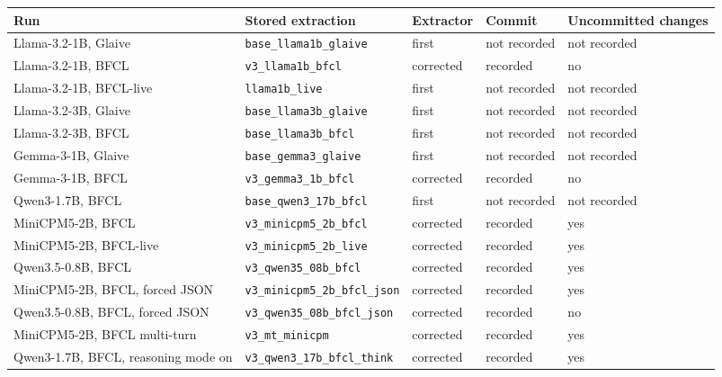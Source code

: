 \begin{tabular}{@{}lllll@{}}
\toprule
Run & Stored extraction & Extractor & Commit & Uncommitted changes \\
\midrule
Llama-3.2-1B, Glaive & \texttt{base\_llama1b\_glaive} & first & not recorded & not recorded \\
Llama-3.2-1B, BFCL & \texttt{v3\_llama1b\_bfcl} & corrected & recorded & no \\
Llama-3.2-1B, BFCL-live & \texttt{llama1b\_live} & first & not recorded & not recorded \\
Llama-3.2-3B, Glaive & \texttt{base\_llama3b\_glaive} & first & not recorded & not recorded \\
Llama-3.2-3B, BFCL & \texttt{base\_llama3b\_bfcl} & first & not recorded & not recorded \\
Gemma-3-1B, Glaive & \texttt{base\_gemma3\_glaive} & first & not recorded & not recorded \\
Gemma-3-1B, BFCL & \texttt{v3\_gemma3\_1b\_bfcl} & corrected & recorded & no \\
Qwen3-1.7B, BFCL & \texttt{base\_qwen3\_17b\_bfcl} & first & not recorded & not recorded \\
MiniCPM5-2B, BFCL & \texttt{v3\_minicpm5\_2b\_bfcl} & corrected & recorded & yes \\
MiniCPM5-2B, BFCL-live & \texttt{v3\_minicpm5\_2b\_live} & corrected & recorded & yes \\
Qwen3.5-0.8B, BFCL & \texttt{v3\_qwen35\_08b\_bfcl} & corrected & recorded & yes \\
MiniCPM5-2B, BFCL, forced JSON & \texttt{v3\_minicpm5\_2b\_bfcl\_json} & corrected & recorded & yes \\
Qwen3.5-0.8B, BFCL, forced JSON & \texttt{v3\_qwen35\_08b\_bfcl\_json} & corrected & recorded & no \\
MiniCPM5-2B, BFCL multi-turn & \texttt{v3\_mt\_minicpm} & corrected & recorded & yes \\
Qwen3-1.7B, BFCL, reasoning mode on & \texttt{v3\_qwen3\_17b\_bfcl\_think} & corrected & recorded & yes \\
\bottomrule
\end{tabular}

